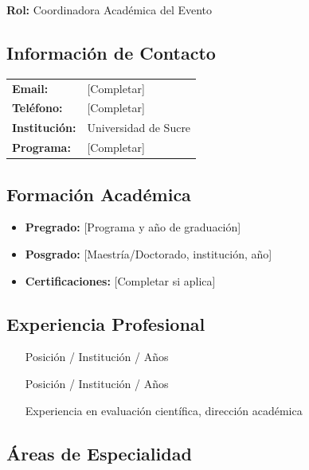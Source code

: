 \documentclass[12pt,a4paper]{article}
\begin{document}
\textbf{Rol:} Coordinadora Académica del Evento

\subsection{Información de Contacto}

\begin{tabular}{ll}
\textbf{Email:} & [Completar] \\
\textbf{Teléfono:} & [Completar] \\
\textbf{Institución:} & Universidad de Sucre \\
\textbf{Programa:} & [Completar] \\
\end{tabular}

\subsection{Formación Académica}

\begin{itemize}[label={\textcolor{verdeosc}{\textbullet}}]
  \item \textbf{Pregrado:} [Programa y año de graduación]
  \item \textbf{Posgrado:} [Maestría/Doctorado, institución, año]
  \item \textbf{Certificaciones:} [Completar si aplica]
\end{itemize}

\subsection{Experiencia Profesional}

\begin{itemize}[label={\textcolor{verdemid}{\textbullet}}]
  \item [Posición / Institución / Años]
  \item [Posición / Institución / Años]
  \item [Experiencia en evaluación científica, dirección académica]
\end{itemize}

\subsection{Áreas de Especialidad}

\begin{tcolorbox}
\end{tcolorbox}
\end{document}

